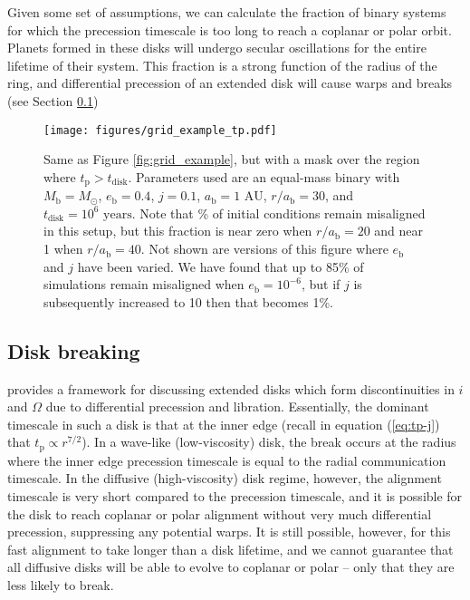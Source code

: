 \documentclass[twocolumn,linenumbers]{aastex631}
\begin{document}
Given some set of assumptions, we can calculate the fraction of binary systems for which the precession timescale is too long to reach a coplanar or polar orbit. Planets formed in these disks will undergo secular oscillations for the entire lifetime of their system. This fraction is a strong function of the radius of the ring, and differential precession of an extended disk will cause warps and breaks (see Section \ref{subsec:breaks})

\begin{figure}
    \texttt{[image: figures/grid\_example\_tp.pdf]}
    \caption{Same as Figure \ref{fig:grid_example}, but with a mask over the region where $t_\text{p} > t_\text{disk}$. Parameters used are an equal-mass binary with $M_\text{b} = M_\odot$, $e_\text{b} = 0.4$, $j=0.1$, $a_\text{b} = 1\text{ AU}$, $r/a_\text{b} = 30$, and $t_\text{disk} = 10^6 \text{ years}$. Note that \% of initial conditions remain misaligned in this setup, but this fraction is near zero when $r/a_\text{b} = 20$ and near 1 when $r/a_\text{b} = 40$. Not shown are versions of this figure where $e_\text{b}$ and $j$ have been varied. We have found that up to 85\% of simulations remain misaligned when $e_\text{b}=10^{-6}$, but if $j$ is subsequently increased to 10 then that becomes 1\%. }
    \label{fig:grid-tp}
\end{figure}

\subsection{Disk breaking}
\label{subsec:breaks}
\citet{rabago2024} provides a framework for discussing extended disks which form discontinuities in $i$ and $\Omega$ due to differential precession and libration. Essentially, the dominant timescale in such a disk is that at the inner edge (recall in equation (\ref{eq:tp-j}) that $t_\text{p} \propto r^{7/2}$).
In a wave-like (low-viscosity) disk, the break occurs at the radius where the inner edge precession timescale is equal to the radial communication timescale. In the diffusive (high-viscosity) disk regime, however, the alignment timescale is very short compared to the precession timescale, and it is possible for the disk to reach coplanar or polar alignment without very much differential precession, suppressing any potential warps. It is still possible, however, for this fast alignment to take longer than a disk lifetime, and we cannot guarantee that all diffusive disks will be able to evolve to coplanar or polar -- only that they are less likely to break.
\end{document}
